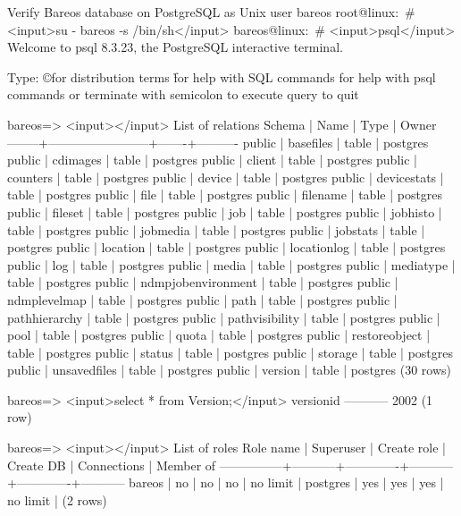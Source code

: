 \begin{commands}{Verify Bareos database on PostgreSQL as Unix user bareos}
root@linux:~# <input>su - bareos -s /bin/sh</input>
bareos@linux:~# <input>psql</input>
Welcome to psql 8.3.23, the PostgreSQL interactive terminal.

Type:  \copyright for distribution terms
       \h for help with SQL commands
       \? for help with psql commands
       \g or terminate with semicolon to execute query
       \q to quit

bareos=> <input>\dt</input>
                 List of relations
 Schema |          Name          | Type  |  Owner
--------+------------------------+-------+----------
 public | basefiles              | table | postgres
 public | cdimages               | table | postgres
 public | client                 | table | postgres
 public | counters               | table | postgres
 public | device                 | table | postgres
 public | devicestats            | table | postgres
 public | file                   | table | postgres
 public | filename               | table | postgres
 public | fileset                | table | postgres
 public | job                    | table | postgres
 public | jobhisto               | table | postgres
 public | jobmedia               | table | postgres
 public | jobstats               | table | postgres
 public | location               | table | postgres
 public | locationlog            | table | postgres
 public | log                    | table | postgres
 public | media                  | table | postgres
 public | mediatype              | table | postgres
 public | ndmpjobenvironment     | table | postgres
 public | ndmplevelmap           | table | postgres
 public | path                   | table | postgres
 public | pathhierarchy          | table | postgres
 public | pathvisibility         | table | postgres
 public | pool                   | table | postgres
 public | quota                  | table | postgres
 public | restoreobject          | table | postgres
 public | status                 | table | postgres
 public | storage                | table | postgres
 public | unsavedfiles           | table | postgres
 public | version                | table | postgres
(30 rows)

bareos=> <input>select * from Version;</input>
 versionid
-----------
      2002
(1 row)

bareos=> <input>\du</input>
                                 List of roles
   Role name   | Superuser | Create role | Create DB | Connections | Member of
---------------+-----------+-------------+-----------+-------------+-----------
 bareos        | no        | no          | no        | no limit    | {}
 postgres      | yes       | yes         | yes       | no limit    | {}
(2 rows)


\end{commands}
